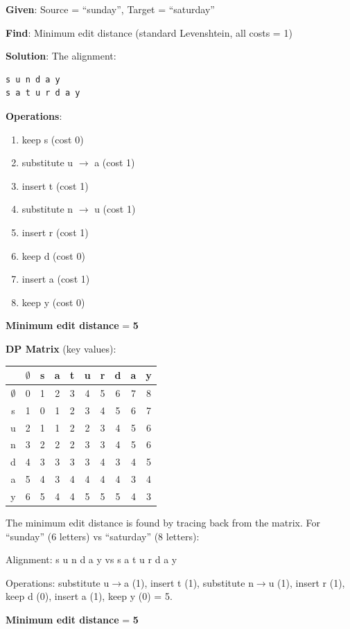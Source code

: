 \documentclass[11pt,a4paper]{article}
\begin{document}
\begin{tcolorbox}[colback=green!5!white,colframe=green!75!black,title=\textbf{Worked Example 16: Edit Distance -- sunday to saturday}]
\textbf{Given}: Source = ``sunday'', Target = ``saturday''

\textbf{Find}: Minimum edit distance (standard Levenshtein, all costs = 1)

\textbf{Solution}:
The alignment:
\begin{verbatim}
s u n d a y
s a t u r d a y
\end{verbatim}

\textbf{Operations}:
\begin{enumerate}
    \item keep s (cost 0)
    \item substitute u $\to$ a (cost 1)
    \item insert t (cost 1)
    \item substitute n $\to$ u (cost 1)
    \item insert r (cost 1)
    \item keep d (cost 0)
    \item insert a (cost 1)
    \item keep y (cost 0)
\end{enumerate}

\textbf{Minimum edit distance} = \textbf{5}

\textbf{DP Matrix} (key values):
\begin{center}
\begin{tabular}{|c|c|c|c|c|c|c|c|c|c|}
\hline
 & $\emptyset$ & s & a & t & u & r & d & a & y \\ \hline
$\emptyset$ & 0 & 1 & 2 & 3 & 4 & 5 & 6 & 7 & 8 \\ \hline
s & 1 & 0 & 1 & 2 & 3 & 4 & 5 & 6 & 7 \\ \hline
u & 2 & 1 & 1 & 2 & 2 & 3 & 4 & 5 & 6 \\ \hline
n & 3 & 2 & 2 & 2 & 3 & 3 & 4 & 5 & 6 \\ \hline
d & 4 & 3 & 3 & 3 & 3 & 4 & 3 & 4 & 5 \\ \hline
a & 5 & 4 & 3 & 4 & 4 & 4 & 4 & 3 & 4 \\ \hline
y & 6 & 5 & 4 & 4 & 5 & 5 & 5 & 4 & 3 \\ \hline
\end{tabular}
\end{center}

The minimum edit distance is found by tracing back from the matrix. For ``sunday'' (6 letters) vs ``saturday'' (8 letters):

Alignment: s u n d a y vs s a t u r d a y

Operations: substitute u$\to$a (1), insert t (1), substitute n$\to$u (1), insert r (1), keep d (0), insert a (1), keep y (0) = 5.

\textbf{Minimum edit distance} = \textbf{5}
\end{tcolorbox}
\end{document}
